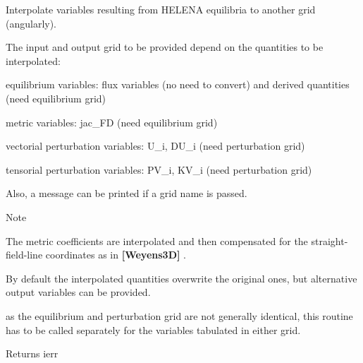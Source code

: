 Interpolate variables resulting from H\+E\+L\+E\+NA equilibria to another grid (angularly). 

The input and output grid to be provided depend on the quantities to be interpolated\+:
\begin{DoxyItemize}
\item equilibrium variables\+: flux variables (no need to convert) and derived quantities (need equilibrium grid)
\item metric variables\+: jac\+\_\+\+FD (need equilibrium grid)
\item vectorial perturbation variables\+: U\+\_\+i, D\+U\+\_\+i (need perturbation grid)
\item tensorial perturbation variables\+: P\+V\+\_\+i, K\+V\+\_\+i (need perturbation grid)
\end{DoxyItemize}

Also, a message can be printed if a grid name is passed.

\begin{DoxyNote}{Note}

\begin{DoxyEnumerate}
\item The metric coefficients are interpolated and then compensated for the straight-\/field-\/line coordinates as in {\bfseries [Weyens3D]} .
\item By default the interpolated quantities overwrite the original ones, but alternative output variables can be provided.
\item as the equilibrium and perturbation grid are not generally identical, this routine has to be called separately for the variables tabulated in either grid.
\end{DoxyEnumerate}
\end{DoxyNote}
\begin{DoxyReturn}{Returns}
ierr
\end{DoxyReturn}

